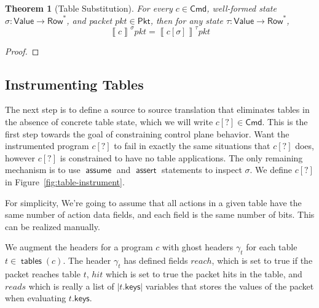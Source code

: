 \documentclass{article}
\newcommand{\pkt}{\mathit{pkt}}
\newcommand{\denote}[1]{\left\llbracket#1\right\rrbracket}
\newcommand{\Value}{\mathsf{Value}}
\newcommand{\Cmd}{\mathsf{Cmd}}
\newcommand{\Pkt}{\mathsf{Pkt}}
\newcommand{\Row}{\mathsf{Row}}
\newcommand{\keys}{\mathsf{keys}}
\newcommand{\reach}{\mathit{\mathit{reach}}}
\newcommand{\hit}{\mathit{hit}}
\newcommand{\reads}{\mathit{reads}}
\newcommand{\assert}{\mathop{\mathsf{assert}}}
\newcommand{\assume}{\mathop{\mathsf{assume}}}
\newcommand{\instr}{[?]}
\newcommand{\tables}{\mathop{\mathsf{tables}}}
\newtheorem{theorem}{Theorem}
\begin{document}
\begin{theorem}[Table Substitution]
  For every $c \in \Cmd$, well-formed state $\sigma : \Value \to \Row^*$, and
  packet $\pkt \in \Pkt$, then for any state $\tau : \Value \to \Row^*$,
  \[\denote{c}^\sigma\pkt = \denote{c[\sigma]}^\tau\pkt\]
\end{theorem}
\begin{proof}
\end{proof}


\subsection{Instrumenting Tables}

The next step is to define a source to source translation that eliminates tables
in the absence of concrete table state, which we will write $c\instr \in \Cmd$.
This is the first step towards the goal of constraining control plane behavior.
Want the instrumented program $c\instr$ to fail in exactly the same situations that
$c\instr$ does, however $c\instr$ is constrained to have no table applications.
The only remaining mechanism is to use $\assume$ and $\assert$ statements to
inspect $\sigma$. We define $c[?]$ in Figure~\ref{fig:table-instrument}.

For simplicity, We're going to assume that all actions in a given table have the
same number of action data fields, and each field is the same number of bits.
This can be realized manually.

We augment the headers for a program $c$ with ghost headers $\gamma_t$ for each
table $t \in \tables(c)$. The header $\gamma_t$ has defined fields
$\reach$, which is set to true if the packet reaches table $t$,
$\hit$ which is set to true the packet hits in the table, and
$\reads$ which is really a list of $|t.\keys|$ variables that stores the
values of the packet when evaluating $t.\keys$.
\end{document}
